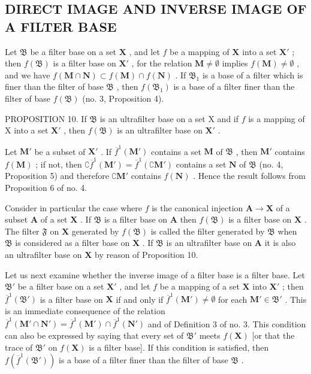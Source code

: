 \subsection{DIRECT IMAGE AND INVERSE IMAGE OF A FILTER BASE}

Let \(\mathfrak{B}\) be a filter base on a set \(\mathbf{X}\) , and let \(f\) be a mapping of \(\mathbf{X}\) into a set \(\mathbf{X}'\) ; then \(f(\mathfrak{B})\) is a filter base on \(\mathbf{X}'\) , for the relation \(\mathbf{M} \neq \emptyset\) implies \(f(\mathbf{M}) \neq \emptyset\) , and we have \(f(\mathbf{M} \cap \mathbf{N}) \subset f(\mathbf{M}) \cap f(\mathbf{N})\) . If \(\mathfrak{B}_1\) is a base of a filter which is finer than the filter of base \(\mathfrak{B}\) , then \(f(\mathfrak{B}_1)\) is a base of a filter finer than the filter of base \(f(\mathfrak{B})\) (no. 3, Proposition 4).

PROPOSITION 10. If \(\mathfrak{B}\) is an ultrafilter base on a set X and if \(f\) is a mapping of X into a set \(\mathbf{X}'\) , then \(f(\mathfrak{B})\) is an ultrafilter base on \(\mathbf{X}'\) .

Let \(\mathbf{M}'\) be a subset of \(\mathbf{X}'\) . If \(\overline{f}^{1}(\mathbf{M}')\) contains a set \(\mathbf{M}\) of \(\mathfrak{B}\) , then \(\mathbf{M}'\) contains \(f(\mathbf{M})\) ; if not, then \(\complement \overline{f}^{1}(\mathbf{M}') = \overline{f}^{1}(\complement \mathbf{M}')\) contains a set \(\mathbf{N}\) of \(\mathfrak{B}\) (no. 4, Proposition 5) and therefore \(\complement \mathbf{M}'\) contains \(f(\mathbf{N})\) . Hence the result follows from Proposition 6 of no. 4.

Consider in particular the case where \(f\) is the canonical injection \(\mathbf{A} \to \mathbf{X}\) of a subset \(\mathbf{A}\) of a set \(\mathbf{X}\) . If \(\mathfrak{B}\) is a filter base on \(\mathbf{A}\) then \(f(\mathfrak{B})\) is a filter base on \(\mathbf{X}\) . The filter \(\mathfrak{F}\) on \(\mathbf{X}\) generated by \(f(\mathfrak{B})\) is called the filter generated by \(\mathfrak{B}\) when \(\mathfrak{B}\) is considered as a filter base on \(\mathbf{X}\) . If \(\mathfrak{B}\) is an ultrafilter base on \(\mathbf{A}\) it is also an ultrafilter base on \(\mathbf{X}\) by reason of Proposition 10.

Let us next examine whether the inverse image of a filter base is a filter base. Let \(\mathfrak{B}'\) be a filter base on a set \(\mathbf{X}'\) , and let \(f\) be a mapping of a set \(\mathbf{X}\) into \(\mathbf{X}'\) ; then \(\overline{f}^{1}(\mathfrak{B}')\) is a filter base on \(\mathbf{X}\) if and only if \(\overline{f}^{1}(\mathbf{M}') \neq \emptyset\) for each \(\mathbf{M}' \in \mathfrak{B}'\) . This is an immediate consequence of the relation \(\overline{f}^{1}(\mathbf{M}' \cap \mathbf{N}') = \overline{f}^{1}(\mathbf{M}') \cap \overline{f}^{1}(\mathbf{N}')\) and of Definition 3 of no. 3. This condition can also be expressed by saying that every set of \(\mathfrak{B}'\) meets \(f(\mathbf{X})\) {[}or that the trace of \(\mathfrak{B}'\) on \(f(\mathbf{X})\) is a filter base{]}. If this condition is satisfied, then \(f(\overline{f}^{1}(\mathfrak{B}'))\) is a base of a filter finer than the filter of base \(\mathfrak{B}\) .

